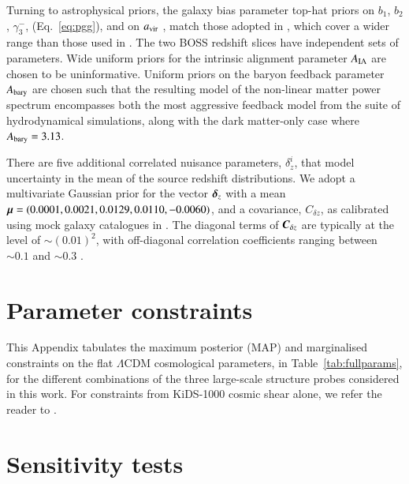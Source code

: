 \begin{appendix}
Turning to astrophysical priors, the galaxy bias parameter top-hat priors on $b_1$, $b_2$,  $\gamma_3^-$, (Eq.~\ref{eq:pgg}), and on $a_{\rm vir}$ \citep[see the `fingers of god' model in equations 6 to 9 of][]{joachimi/etal:inprep},
match those adopted in \citet{troester/etal:2020}, which cover a wider range than those used in \citet{sanchez/etal:2017}.  
The two BOSS redshift slices have independent sets of parameters.   
Wide uniform priors for the intrinsic alignment parameter $A_{\rm IA}$ are chosen to be uninformative.    
Uniform priors on the baryon feedback parameter $A_{\rm bary}$ are chosen such that the resulting \citet{mead/etal:2016} model of the non-linear matter power spectrum encompasses both the most aggressive feedback model from the \citet{vandaalen/etal:2011} suite of hydrodynamical simulations, along with the dark matter-only case where $A_{\rm bary}=3.13$.

There are five additional correlated nuisance parameters, $\delta^i_z$, that model uncertainty in the mean of the source redshift distributions.  We adopt a multivariate Gaussian prior for the vector $\mbox{\boldmath $\delta$}_z$ with a mean $\mbox{\boldmath $\mu$} = (0.0001,0.0021,0.0129,0.0110,-0.0060)$, and a covariance, $C_{\delta z}$, as calibrated using mock galaxy catalogues in \citet{wright/etal:2020}.   
The diagonal terms of $\mbox{\boldmath $C$}_{\delta z}$ are typically at the level of $\sim\!(0.01)^2$, with off-diagonal correlation coefficients ranging between $\sim\! 0.1$ and $\sim\! 0.3$ \citep[see section 3 and figure 2 of][for details]{hildebrandt/etal:inprep}.


\section{Parameter constraints}
\label{app:parameter-constraints}
This Appendix tabulates the maximum posterior (MAP) and marginalised constraints on the flat $\Lambda$CDM cosmological parameters, in Table~\ref{tab:fullparams}, for the different combinations of the three large-scale structure probes considered in this work.   For constraints from KiDS-1000 cosmic shear alone, we refer the reader to \citet{asgari/etal:inprep}.


\section{Sensitivity tests}
\label{app:sensitivity}


\end{appendix}
